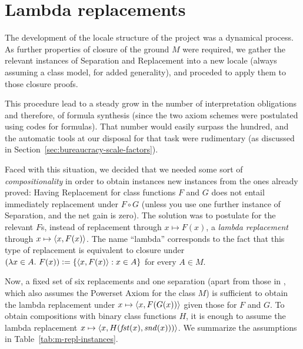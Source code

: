 \section{Lambda replacements}\label{sec:lambda-replacements}

The development of the locale structure of the project was a dynamical
process. As further properties of closure of the ground $M$ were
required, we gather the relevant instances of Separation and
Replacement into a new locale (always assuming a class model, for
added generality), and proceded to apply them to those closure proofs.

This procedure lead to a steady grow in the number of interpretation
obligations and therefore, of formula synthesis (since the two axiom
schemes were postulated using codes for formulas). That number would
easily surpass the hundred, and the automatic tools at our disposal
for that task were rudimentary (as discussed in
Section~\ref{sec:bureaucracy-scale-factors}).

Faced with this situation, we decided that we needed some sort of
\emph{compositionality} in order to obtain instances new instances
from the ones already proved: Having Replacement for class functions
$F$ and $G$ does not entail immediately replacement under $F\circ G$
(unless you use one further instance of Separation, and the net gain
is zero). The solution was to postulate for the relevant $F$s, instead
of replacement through $x\mapsto F(x)$, a \emph{lambda replacement}
through $x\mapsto \langle x,F(x)\rangle$. The name “lambda” corresponds to the
fact that this type of replacement is equivalent to closure under
$(\lambda x\in A.\ F(x)) \mathrel{\mathop:}= \{ \langle x,F(x)\rangle : x\in A \}$ for every
$A\in M$.

Now, a fixed set of six replacements and one separation (apart from
those in , which also assumes the Powerset
Axiom for the class $M$) is sufficient to obtain the lambda
replacement under $x\mapsto \langle x,F(G(x))\rangle$ given those for $F$ and
$G$. To obtain compositions with binary class functions $H$, it is
enough to assume the lambda replacement
$x\mapsto \langle x,H(\mathit{fst}(x),\mathit{snd}(x)))\rangle$. We summarize
the assumptions in Table~\ref{tab:m-repl-instances}.

